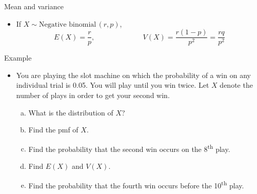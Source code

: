 \documentclass{article}
\newcommand{\follow}[1]{\sim \text{#1}\,}		%
\begin{document}
Mean and variance\bigskip
\begin{itemize}
    \item If $X \follow{Negative binomial}(r, p)$,
    \[E(X) = \frac{r}{p}, \hspace{80pt} V(X) = \frac{r(1 - p)}{p^2} = \frac{rq}{p^2}\]
\end{itemize}\bigskip

Example\bigskip
\begin{itemize}
    \item You are playing the slot machine on which the probability of a win on any individual trial is 0.05. You will play until you win twice. Let $X$ denote the number of plays in order to get your second win.
    \begin{enumerate}[a)]
        \item What is the distribution of $X$?\vspace{40pt}
        \item Find the pmf of $X$.\vspace{50pt}
        \item Find the probability that the second win occurs on the 8\textsuperscript{th} play.\vspace{40pt}
        \item Find $E(X)$ and $V(X)$.\vspace{80pt}
        \item Find the probability that the fourth win occurs before the 10\textsuperscript{th} play.\vspace{80pt}
    \end{enumerate}
\end{itemize}\bigskip

\newpage%
\end{document}
